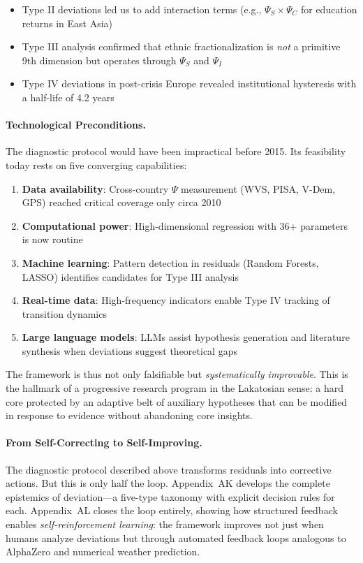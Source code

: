 \begin{itemize}
    \item Type II deviations led us to add interaction terms (e.g., 
          $\Psi_S \times \Psi_C$ for education returns in East Asia)
    \item Type III analysis confirmed that ethnic fractionalization is 
          \emph{not} a primitive 9th dimension but operates through 
          $\Psi_S$ and $\Psi_I$
    \item Type IV deviations in post-crisis Europe revealed institutional 
          hysteresis with a half-life of 4.2 years
\end{itemize}

\paragraph{Technological Preconditions.}
The diagnostic protocol would have been impractical before 2015. Its 
feasibility today rests on five converging capabilities:

\begin{enumerate}
    \item \textbf{Data availability}: Cross-country $\Psi$ measurement 
          (WVS, PISA, V-Dem, GPS) reached critical coverage only circa 2010
    \item \textbf{Computational power}: High-dimensional regression with 
          36+ parameters is now routine
    \item \textbf{Machine learning}: Pattern detection in residuals 
          (Random Forests, LASSO) identifies candidates for Type III analysis
    \item \textbf{Real-time data}: High-frequency indicators enable 
          Type IV tracking of transition dynamics
    \item \textbf{Large language models}: LLMs assist hypothesis generation 
          and literature synthesis when deviations suggest theoretical gaps
\end{enumerate}

The framework is thus not only falsifiable but \emph{systematically improvable}. 
This is the hallmark of a progressive research program in the Lakatosian sense: 
a hard core protected by an adaptive belt of auxiliary hypotheses that can be 
modified in response to evidence without abandoning core insights.

\paragraph{From Self-Correcting to Self-Improving.}
The diagnostic protocol described above transforms residuals into corrective actions.
But this is only half the loop. Appendix~AK develops the complete epistemics of
deviation---a five-type taxonomy with explicit decision rules for each. Appendix~AL
closes the loop entirely, showing how structured feedback enables \emph{self-reinforcement
learning}: the framework improves not just when humans analyze deviations but
through automated feedback loops analogous to AlphaZero and numerical weather prediction.

